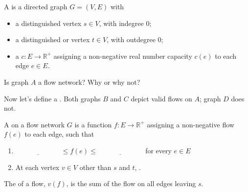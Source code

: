 \documentclass{tufte-handout}
\begin{document}
\newcommand{\R}{\mathbb{R}}

\pause
\begin{defn}
  A  is a directed graph $G = (V,E)$ with
  \begin{itemize}
  \item a distinguished  vertex $s \in V$, with indegree 0;
  \item a distinguished  or  vertex $t \in V$,
    with outdegree 0;
  \item a  $c : E \to \R^+$ assigning a
    non-negative real number capacity $c(e)$ to each edge $e \in E$.
  \end{itemize}
\end{defn}

\begin{questions}
  \item Is graph $A$ a flow network?  Why or why not?
\end{questions}

Now let's define a .  Both graphs $B$ and $C$ depict valid
flows on $A$; graph $D$ does not.

\begin{defn}
  A  on a flow network $G$ is a function $f : E \to \R^+$
  assigning a non-negative flow $f(e)$ to each edge, such that
  \begin{enumerate}
  \item $\underline{\phantom{XXXXXXXX}} \leq f(e) \leq
    \underline{\phantom{XXXXXXXX}}$ for every $e \in E$
  \item At each vertex $v \in V$ other than $s$ and $t$, \blank
    \newline \blank.
  \end{enumerate}
\end{defn}

\begin{defn}
  The  of a flow, $v(f)$, is the sum of the flow on all
  edges leaving $s$.
\end{defn}
\end{document}
